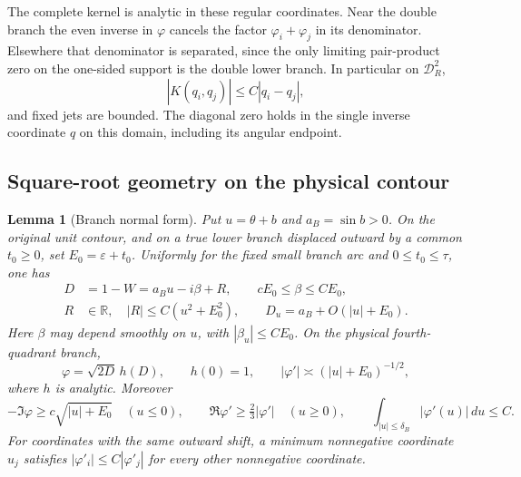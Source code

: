 \documentclass[11pt]{article}
\numberwithin{equation}{section}
\newtheorem{lemma}[theorem]{Lemma}
\theoremstyle{remark}\newtheorem{remark}[theorem]{Remark}
\begin{document}
The complete kernel is analytic in these regular coordinates. Near
the double branch the even inverse in $\varphi$ cancels the factor
$\varphi_i+\varphi_j$ in its denominator. Elsewhere that denominator
is separated, since the only limiting pair-product zero on the
one-sided support is the double lower branch. In particular on
$\mathcal D_R^2$,
\begin{equation}\label{eq:q-3}
|K(q_i,q_j)|\le C|q_i-q_j|,
\end{equation}
and fixed jets are bounded. The diagonal zero holds in the single inverse coordinate $q$ on
this domain, including its angular endpoint.

\subsection{Square-root geometry on the physical contour}
\begin{lemma}[Branch normal form]\label{lem:constrained-branch-geometry}
Put $u=\theta+b$ and $a_B=\sin b>0$.  On the original unit
contour, and on a true lower branch displaced outward by a common
$t_0\ge0$, set $E_0=\varepsilon+t_0$.  Uniformly for the fixed
small branch arc and $0\le t_0\le\tau$, one has
\[
 \begin{aligned}
 D&=1-W=a_Bu-i\beta+R,\qquad cE_0\le\beta\le CE_0,\\
 R&\in\mathbb R,\quad |R|\le C(u^2+E_0^2),\qquad
 D_u=a_B+O(|u|+E_0).
 \end{aligned}
\]
Here $\beta$ may depend smoothly on $u$, with
$|\beta_u|\le CE_0$.  On the physical fourth-quadrant branch,
\begin{equation}\label{eq:constrained-branch-bounds}
 \varphi=\sqrt{2D}\,h(D),\qquad h(0)=1,
 \qquad |\varphi'|\asymp(|u|+E_0)^{-1/2},
\end{equation}
where $h$ is analytic.  Moreover
\[
 -\Im\varphi\ge c\sqrt{|u|+E_0}\quad(u\le0),\qquad
 \Re\varphi'\ge\tfrac23|\varphi'|\quad(u\ge0),\qquad
 \int_{|u|\le\delta_B}|\varphi'(u)|\,du\le C.
\]
For coordinates with the same outward shift, a minimum nonnegative
coordinate $u_j$ satisfies $|\varphi'_i|\le C|\varphi'_j|$
for every other nonnegative coordinate.

\end{lemma}
\end{document}
